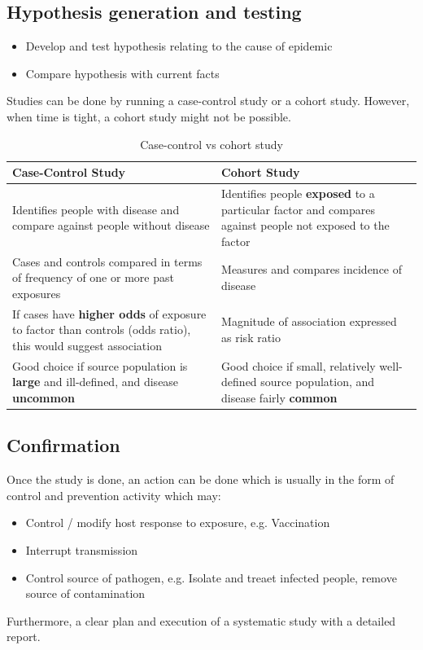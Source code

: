 \documentclass{article}
\begin{document}
\subsection{Hypothesis generation and testing}
\begin{itemize}
    \item Develop and test hypothesis relating to the cause of epidemic
    \item Compare hypothesis with current facts
\end{itemize}
Studies can be done by running a case-control study or a cohort study. However, when time is tight, a cohort study might not be possible.
\begin{table}[H]
\centering
\begin{tabularx}{\textwidth}{|X|X|}
\hline
\textbf{Case-Control Study} & \textbf{Cohort Study} \\ \hline
Identifies people with disease and compare against people without disease & Identifies people \textbf{exposed} to a particular factor and compares against people not exposed to the factor \\ \hline
Cases and controls compared in terms of frequency of one or more past exposures & Measures and compares incidence of disease \\ \hline
If cases have \textbf{higher odds} of exposure to factor than controls (odds ratio), this would suggest association & Magnitude of association expressed as risk ratio \\ \hline
Good choice if source population is \textbf{large} and ill-defined, and disease \textbf{uncommon} & Good choice if small, relatively well-defined source population, and disease fairly \textbf{common} \\ \hline
\end{tabularx}
\caption{Case-control vs cohort study}
\label{tab:case-control-vs-cohort}
\end{table}

\subsection{Confirmation}
Once the study is done, an action can be done which is usually in the form of control and prevention activity which may:
\begin{itemize}
    \item Control / modify host response to exposure, e.g. Vaccination
    \item Interrupt transmission
    \item Control source of pathogen, e.g. Isolate and treaet infected people, remove source of contamination
\end{itemize}
Furthermore, a clear plan and execution of a systematic study with a detailed report.
\end{document}
